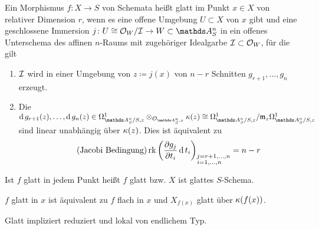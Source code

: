 \documentclass[german]{scrreprt}
\begin{document}
\begin{Definition}
  Ein Morphismus $f\colon X\to S$ von Schemata heißt glatt im Punkt
  $x\in X$ von relativer Dimension $r$, wenn es eine offene Umgebung
  $U\subset X$ von $x$ gibt und eine geschlossene Immersion $j\colon
  U\cong\O_W/\I\to W\subset\A_S^n$ in ein offenes Unterschema des affinen
  $n$-Raums mit zugehöriger Idealgarbe $\mathcal{I}\subset\mathcal{O}_W$, für die
  gilt
  \begin{enumerate}[label=(\alph*)]
  \item $\mathcal{I}$ wird in einer Umgebung von $z\coloneqq j(x)$ von $n-r$ Schnitten
    $g_{r+1},\dotsc,g_{n}$ erzeugt.
  \item Die $\d g_{r+1}(z),\dotsc,\d g_{n}(z)\in 
    \Om{\A_S^n/S,z} \otimes_{\O_{\A_S^n,z}} \k(z)
    \cong \Om{\A_S^n/S,z}/\m_z\Om{\A_S^n/S,z}$ 
    sind linear unabhängig über $\kappa(z)$.
    Dies ist äquivalent zu
    \begin{gather*}\tag{Jacobi Bedingung}
      \operatorname{rk}\left(
        \frac{\partial g_j}{\partial t_i}\operatorname{d} t_i 
      \right)_{\substack{j=r+1,\dotsc,n\\i=1,\dotsc,n\phantom{+1}}}
      = n-r
    \end{gather*}
  \end{enumerate}
  Ist $f$ glatt in jedem Punkt heißt $f$ glatt bzw. $X$ ist glattes
  $S$-Schema.  
  \cite[8.5, Definition 1]{bosch}

  $f$ glatt in $x$ ist äquivalent zu $f$ flach in $x$ und $X_{f(x)}$
  glatt über $\kappa(f(x))$.
  \cite[8.5, Proposition 17]{bosch}

  \begin{Bemerkung}
    Glatt impliziert reduziert und lokal von endlichem Typ.
  \end{Bemerkung}
\end{Definition}
\end{document}
